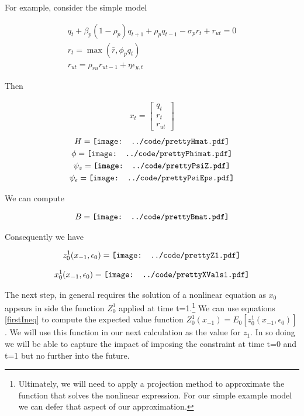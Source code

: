 \documentclass[12pt]{article}
\begin{document}
For example, consider the simple model


\begin{gather*}
q_{t} +\beta_p(1 - \rho_p)q_{t + 1} + \rho_pq_{t - 1} - \sigma_pr_{t} +
     r_{ut}=0\\
 r_{t} = \max (\bar{r}, \phi_pq_{t}) \\
 r_{ut} = \rho_{ru} r_{ut - 1} + \eta \epsilon_{y,t}
\end{gather*}

Then 

\begin{gather*}
  x_t=
  \begin{bmatrix}
    q_t\\r_{t}\\r_{ut}
  \end{bmatrix}
\end{gather*}
\begin{gather*}
  H= \vcenter{\hbox{\texttt{[image: ../code/prettyHmat.pdf]}}}\\
\phi=   \vcenter{\hbox{\texttt{[image: ../code/prettyPhimat.pdf]}}}\\
\psi_z=   \vcenter{\hbox{\texttt{[image: ../code/prettyPsiZ.pdf]}}}\\
\psi_\epsilon=   \vcenter{\hbox{\texttt{[image: ../code/prettyPsiEps.pdf]}}}\\
\end{gather*}

We can compute 

 \begin{gather*}
B=   \vcenter{\hbox{\texttt{[image: ../code/prettyBmat.pdf]}}}
 \end{gather*}

Consequently we have

 \begin{gather*}
z_0^1(x_{-1},\epsilon_0)=   \vcenter{\hbox{\texttt{[image: ../code/prettyZ1.pdf]}}}
 \end{gather*}


 \begin{gather*}
x_0^1(x_{-1},\epsilon_0)=   \vcenter{\hbox{\texttt{[image: ../code/prettyXVals1.pdf]}}}
 \end{gather*}




The next step, in general requires the solution of a nonlinear equation as $x_0$ appears in side the function $Z_0^1$ applied at time t=1.\footnote{Ultimately, we will  need to apply a projection method to approximate the function 
that solves the nonlinear expression.  For our simple example model we can defer that aspect of our approximation.}
We can use equations \ref{firstIneq} to compute the expected value function $Z_0^1(x_{-1})=E_{0}[z_0^1(x_{-1},\epsilon_0)]$.  We will use this function in 
our next calculation as the value for $z_{1}$.  In so doing we will be able to
capture the impact of imposing the constraint at time t=0 and t=1 but no further into the future.
\end{document}
